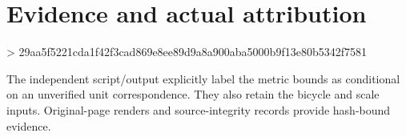 \documentclass[10pt]{article}
\begin{document}
\section*{Evidence and actual attribution}
> 29aa5f5221cda1f42f3cad869e8ee89d9a8a900aba5000b9f13e80b5342f7581\par
The independent script/output explicitly label the metric bounds as conditional on an unverified unit correspondence. They also retain the bicycle and scale inputs. Original-page renders and source-integrity records provide hash-bound evidence.\par
\end{document}
